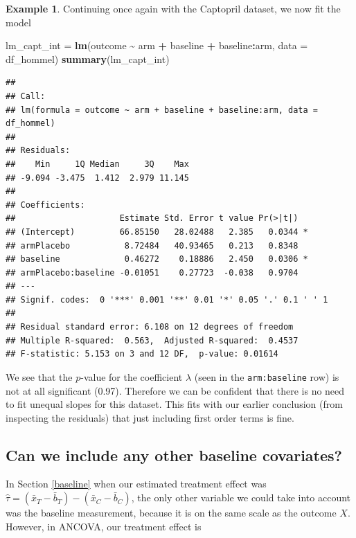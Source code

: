 \documentclass[
  openany]{book}
\newenvironment{Shaded}{\begin{snugshade}}{\end{snugshade}}
\newcommand{\AttributeTok}[1]{\textcolor[rgb]{0.13,0.29,0.53}{#1}}
\newcommand{\FunctionTok}[1]{\textcolor[rgb]{0.13,0.29,0.53}{\textbf{#1}}}
\newcommand{\NormalTok}[1]{#1}
\newcommand{\OtherTok}[1]{\textcolor[rgb]{0.56,0.35,0.01}{#1}}
\newcommand{\SpecialCharTok}[1]{\textcolor[rgb]{0.81,0.36,0.00}{\textbf{#1}}}
\theoremstyle{definition}
\theoremstyle{definition}
\newtheorem{example}{Example}[chapter]
\theoremstyle{definition}
\theoremstyle{definition}
\theoremstyle{remark}
\begin{document}
\begin{example}
Continuing once again with the Captopril dataset, we now fit the model

\begin{Shaded}
\begin{Highlighting}[]
\NormalTok{lm\_capt\_int }\OtherTok{=} \FunctionTok{lm}\NormalTok{(outcome }\SpecialCharTok{\textasciitilde{}}\NormalTok{ arm }\SpecialCharTok{+}\NormalTok{ baseline }\SpecialCharTok{+}\NormalTok{ baseline}\SpecialCharTok{:}\NormalTok{arm, }\AttributeTok{data =}\NormalTok{ df\_hommel)}
\FunctionTok{summary}\NormalTok{(lm\_capt\_int)}
\end{Highlighting}
\end{Shaded}

\begin{verbatim}
## 
## Call:
## lm(formula = outcome ~ arm + baseline + baseline:arm, data = df_hommel)
## 
## Residuals:
##    Min     1Q Median     3Q    Max 
## -9.094 -3.475  1.412  2.979 11.145 
## 
## Coefficients:
##                     Estimate Std. Error t value Pr(>|t|)  
## (Intercept)         66.85150   28.02488   2.385   0.0344 *
## armPlacebo           8.72484   40.93465   0.213   0.8348  
## baseline             0.46272    0.18886   2.450   0.0306 *
## armPlacebo:baseline -0.01051    0.27723  -0.038   0.9704  
## ---
## Signif. codes:  0 '***' 0.001 '**' 0.01 '*' 0.05 '.' 0.1 ' ' 1
## 
## Residual standard error: 6.108 on 12 degrees of freedom
## Multiple R-squared:  0.563,  Adjusted R-squared:  0.4537 
## F-statistic: 5.153 on 3 and 12 DF,  p-value: 0.01614
\end{verbatim}

We see that the \(p\)-value for the coefficient \(\lambda\) (seen in the \texttt{arm:baseline} row) is not at all significant (0.97). Therefore we can be confident that there is no need to fit unequal slopes for this dataset. This fits with our earlier conclusion (from inspecting the residuals) that just including first order terms is fine.
\end{example}

\hypertarget{can-we-include-any-other-baseline-covariates}{%
\subsection{Can we include any other baseline covariates?}\label{can-we-include-any-other-baseline-covariates}}

In Section \ref{baseline} when our estimated treatment effect was \(\hat\tau = \left(\bar{x}_T - \bar{b}_T\right) - \left(\bar{x}_C - \bar{b}_C\right)\), the only other variable we could take into account was the baseline measurement, because it is on the same scale as the outcome \(X\). However, in ANCOVA, our treatment effect is
\end{document}
